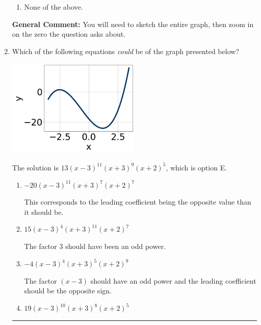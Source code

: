 \documentclass{extbook}[14pt]
\newcommand{\litem}[1]{\item #1

\rule{\textwidth}{0.4pt}}
\begin{document}
\begin{enumerate}
{\begin{enumerate}[label=\Alph*.]
\item None of the above.\end{enumerate}
\textbf{General Comment:} You will need to sketch the entire graph, then zoom in on the zero the question asks about.
}
\litem{
Which of the following equations \textit{could} be of the graph presented below?

\begin{center}
    \includegraphics[width=0.5\textwidth]{../Figures/polyGraphToFunctionCopyA.png}
\end{center}




The solution is \( 13(x - 3)^{11} (x + 3)^{9} (x + 2)^{5} \), which is option E.\begin{enumerate}[label=\Alph*.]
\item \( -20(x - 3)^{11} (x + 3)^{7} (x + 2)^{7} \)

This corresponds to the leading coefficient being the opposite value than it should be.
\item \( 15(x - 3)^{4} (x + 3)^{11} (x + 2)^{7} \)

The factor $3$ should have been an odd power.
\item \( -4(x - 3)^{4} (x + 3)^{5} (x + 2)^{9} \)

The factor $(x - 3)$ should have an odd power and the leading coefficient should be the opposite sign.
\item \( 19(x - 3)^{10} (x + 3)^{8} (x + 2)^{5} \)


\end{enumerate}}
\end{enumerate}
\end{document}
